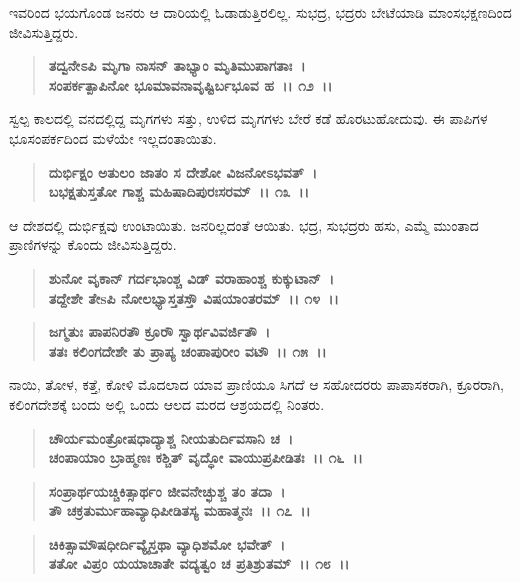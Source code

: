 ಇವರಿಂದ ಭಯಗೊಂಡ ಜನರು ಆ ದಾರಿಯಲ್ಲಿ ಓಡಾಡುತ್ತಿರಲಿಲ್ಲ. ಸುಭದ್ರ, ಭದ್ರರು ಬೇಟೆಯಾಡಿ ಮಾಂಸಭಕ್ಷಣದಿಂದ ಜೀವಿಸುತ್ತಿದ್ದರು.

\begin{verse}
\textbf{ತದ್ವನೇಽಪಿ ಮೃಗಾ ನಾಸನ್ ತಾಭ್ಯಾಂ ಮೃತಿಮುಪಾಗತಾಃ~।}\\\textbf{ಸಂಪರ್ಕತ್ಪಾಪಿನೋ ಭೂಮಾವನಾವೃಷ್ಟಿರ್ಬಭೂವ ಹ~।। ೧೨~।।}
\end{verse}

ಸ್ವಲ್ಪ ಕಾಲದಲ್ಲಿ ವನದಲ್ಲಿದ್ದ ಮೃಗಗಳು ಸತ್ತು, ಉಳಿದ ಮೃಗಗಳು ಬೇರೆ ಕಡೆ ಹೊರಟುಹೋದುವು. ಈ ಪಾಪಿಗಳ ಭೂಸಂಪರ್ಕದಿಂದ ಮಳೆಯೇ ಇಲ್ಲದಂತಾಯಿತು.

\begin{verse}
\textbf{ದುರ್ಭಿಕ್ಷಂ ಅತುಲಂ ಜಾತಂ ಸ ದೇಶೋ ವಿಜನೋಽಭವತ್~।}\\\textbf{ಬಭಕ್ಷತುಸ್ತತೋ ಗಾಶ್ಚ ಮಹಿಷಾದಿಪುರಃಸರಮ್~।। ೧೩~।।}
\end{verse}

ಆ ದೇಶದಲ್ಲಿ ದುರ್ಭಿಕ್ಷವು ಉಂಟಾಯಿತು. ಜನರಿಲ್ಲದಂತೆ ಆಯಿತು. ಭದ್ರ, ಸುಭದ್ರರು ಹಸು, ಎಮ್ಮೆ ಮುಂತಾದ ಪ್ರಾಣಿಗಳನ್ನು ಕೊಂದು ಜೀವಿಸುತ್ತಿದ್ದರು.

\begin{verse}
\textbf{ಶುನೋ ವೃಕಾನ್ ಗರ್ದಭಾಂಶ್ಚ ವಿಡ್ ವರಾಹಾಂಶ್ಚ ಕುಕ್ಕುಟಾನ್~।}\\\textbf{ತದ್ದೇಶೇ ತೇsಪಿ ನೋಲಭ್ಯಾಸ್ತತಸ್ತೌ ವಿಷಯಾಂತರಮ್~।। ೧೪~।। }
\end{verse}

\begin{verse}
\textbf{ಜಗ್ಮತುಃ ಪಾಪನಿರತೌ ಕ್ರೂರೌ ಸ್ವಾರ್ಥವಿವರ್ಜಿತೌ~।}\\\textbf{ತತಃ ಕಲಿಂಗದೇಶೇ ತು ಪ್ರಾಪ್ಯ ಚಂಪಾಪುರೀಂ ವಟೌ~।। ೧೫~।।}
\end{verse}

ನಾಯಿ, ತೋಳ, ಕತ್ತೆ, ಕೋಳಿ ಮೊದಲಾದ ಯಾವ ಪ್ರಾಣಿಯೂ ಸಿಗದೆ ಆ ಸಹೋದರರು ಪಾಪಾಸಕರಾಗಿ, ಕ್ರೂರರಾಗಿ, ಕಲಿಂಗದೇಶಕ್ಕೆ ಬಂದು ಅಲ್ಲಿ ಒಂದು ಆಲದ ಮರದ ಆಶ್ರಯದಲ್ಲಿ ನಿಂತರು.

\begin{verse}
\textbf{ಚೌರ್ಯಮಂತ್ರೋಷಧಾದ್ಯಾಶ್ಚ ನೀಯತುರ್ದಿವಸಾನಿ ಚ~।}\\\textbf{ಚಂಪಾಯಾಂ ಬ್ರಾಹ್ಮಣಃ ಕಶ್ಚಿತ್ ವೃದ್ಧೋ ವಾಯುಪ್ರಪೀಡಿತಃ~।। ೧೬~।।}
\end{verse}

\begin{verse}
\textbf{ಸಂಪ್ರಾರ್ಥಯಚ್ಚಿಕಿತ್ಸಾರ್ಥಂ ಜೀವನೇಚ್ಛುಶ್ಚ ತಂ ತದಾ~।}\\\textbf{ತೌ ಚಕ್ರತುರ್ಮುಹಾವ್ಯಾಧಿಪೀಡಿತಸ್ಯ ಮಹಾತ್ಮನಃ~।। ೧೭~।।}
\end{verse}

\begin{verse}
\textbf{ಚಿಕಿತ್ಸಾಮೌಷಧೀರ್ದಿವ್ಯೈಸ್ತಥಾ ವ್ಯಾಧಿಶಮೋ ಭವೇತ್~।}\\\textbf{ತತೋ ವಿಪ್ರಂ ಯಯಾಚಾತೇ ವದ್ಯತ್ವಂ ಚ ಪ್ರತಿಶ್ರುತಮ್~।। ೧೮~।।}
\end{verse}

